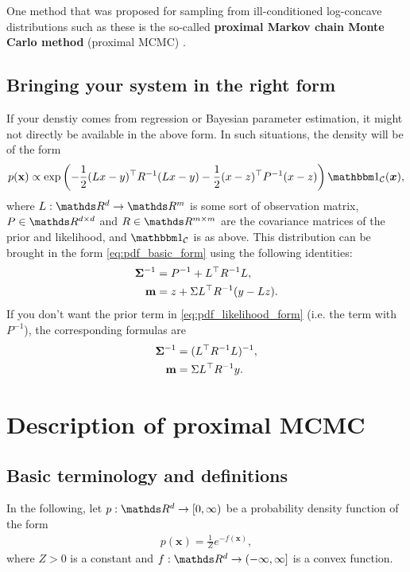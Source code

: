 \documentclass[10pt]{article}
\numberwithin{equation}{section}
\begin{document}
One method that was proposed for sampling from ill-conditioned log-concave distributions such as these is the so-called \textbf{proximal Markov chain Monte Carlo method} (proximal MCMC) \cite{Per16, DurMouPer18}.

\subsection{Bringing your system in the right form}

If your denstiy comes from regression or Bayesian parameter estimation, it might not directly be available in the above form. In such situations, the density will be of the form
\begin{align}
p(\*x) \propto \exp \left( - \frac{1}{2} (L x - y)^\top R^{-1} (Lx - y) - \frac{1}{2} (x - z)^\top P^{-1} (x - z) \right) \indicator{\mathcal C}(\bm x), \label{eq:pdf_likelihood_form}
\end{align}
where $L: \R^d \to \R^m$ is some sort of observation matrix, $P \in \R^{d \times d}$ and $R \in \R^{m \times m}$ are the covariance matrices of the prior and likelihood, and $\indicator{\mathcal C}$ is as above. This distribution can be brought in the form \eqref{eq:pdf_basic_form} using the following identities:
\begin{align}
\mathbf{\Sigma}^{-1} &= P^{-1} + L^\top R^{-1} L, \label{eq:sigma_formula} \\
\mathbf{m} &= z + \Sigma L^\top R^{-1} (y - L z). \label{eq:m_formula}
\end{align}
If you don't want the prior term in \eqref{eq:pdf_likelihood_form} (i.e. the term with $P^{-1}$), the corresponding formulas are
\begin{align*}
\mathbf{\Sigma}^{-1} & = (L^\top R^{-1} L)^{-1}, \\
\mathbf{m} & = \Sigma L^\top R^{-1} y.
\end{align*}




\section{Description of proximal MCMC}

\subsection{Basic terminology and definitions}

In the following, let $p: \R^d \to [0, \infty)$ be a probability density function of the form
\begin{align*}
p(\bm x) = \frac{1}{Z} e^{-f(\bm x)},
\end{align*}
where $Z > 0$ is a constant and $f: \R^d \to (-\infty, \infty]$ is a convex function.
\end{document}
